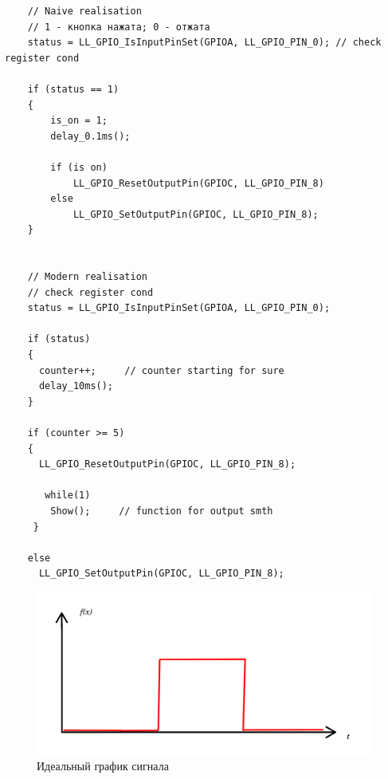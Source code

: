 \begin{verbatim}
    // Naive realisation
    // 1 - кнопка нажата; 0 - отжата
    status = LL_GPIO_IsInputPinSet(GPIOA, LL_GPIO_PIN_0); // check register cond
    
    if (status == 1) 
    {   
        is_on = 1;
        delay_0.1ms();
        
        if (is on)
            LL_GPIO_ResetOutputPin(GPIOC, LL_GPIO_PIN_8) 
        else 
            LL_GPIO_SetOutputPin(GPIOC, LL_GPIO_PIN_8);
    }
    
    
    // Modern realisation
    // check register cond
    status = LL_GPIO_IsInputPinSet(GPIOA, LL_GPIO_PIN_0);
 
    if (status)
    {
      counter++;     // counter starting for sure
      delay_10ms();
    }
        
    if (counter >= 5)                                   
    {
      LL_GPIO_ResetOutputPin(GPIOC, LL_GPIO_PIN_8);
        
       while(1)
        Show();     // function for output smth
     }
   
    else
      LL_GPIO_SetOutputPin(GPIOC, LL_GPIO_PIN_8);
\end{verbatim}



\begin{figure}[h!]
		\centering
		\includegraphics[width=1\linewidth]{pics/ideal_sing.png}
		\caption{Идеальный график сигнала}
		\label{ideal_graph}
\end{figure}
